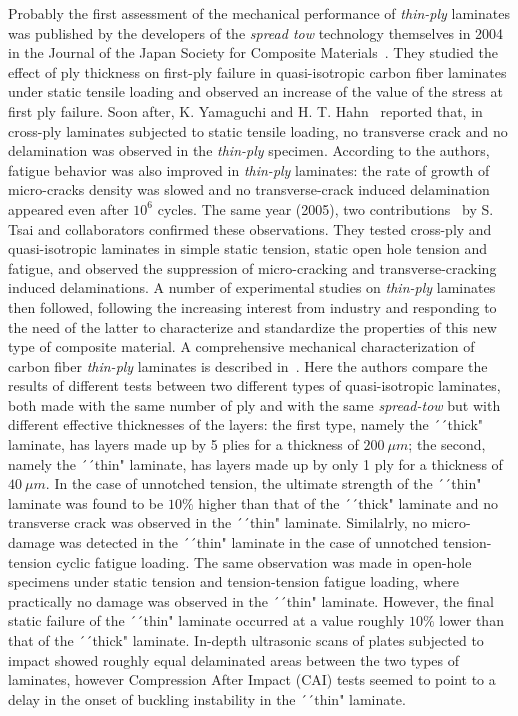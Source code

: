 \begin{description}
Probably the first assessment of the mechanical performance of \emph{thin-ply} laminates was published by the developers of the \emph{spread tow} technology themselves in 2004 in the Journal of the Japan Society for Composite Materials~\cite{sasayamaJSCM2004}. They studied the effect of ply thickness on first-ply failure in quasi-isotropic carbon fiber laminates under static tensile loading and observed an increase of the value of the stress at first ply failure.  Soon after, K. Yamaguchi and H. T. Hahn~\cite{Yamaguchi2005} reported that, in cross-ply laminates subjected to static tensile loading, no transverse crack and no delamination was observed in the \emph{thin-ply} specimen. According to the authors, fatigue behavior was also improved in \emph{thin-ply} laminates: the rate of growth of micro-cracks density was slowed and no transverse-crack induced delamination appeared even after $10^{6}$ cycles. The same year (2005), two contributions~\cite{TsaiICCM2005,Tsai2005} by S. Tsai and collaborators confirmed these observations. They tested cross-ply and quasi-isotropic laminates in simple static tension, static open hole tension and fatigue, and observed the suppression of micro-cracking and transverse-cracking induced delaminations. A number of experimental studies on \emph{thin-ply} laminates then followed, following the increasing interest from industry and responding to the need of the latter to characterize and standardize the properties of this new type of composite material. A comprehensive mechanical characterization of carbon fiber \emph{thin-ply} laminates is described in~\cite{Sihn2007}. Here the authors compare the results of different tests between two different types of quasi-isotropic laminates, both made with the same number of ply and with the same \emph{spread-tow} but with different effective thicknesses of the layers: the first type, namely the ´´thick" laminate, has layers made up by 5 plies for a thickness of $200\ \mu m$; the second, namely the ´´thin" laminate, has layers made up by only 1 ply for a thickness of $40\ \mu m$. In the case of unnotched tension, the ultimate strength of the ´´thin" laminate was found to be $10\%$ higher than that of the ´´thick" laminate and no transverse crack was observed in the ´´thin" laminate. Similalrly, no micro-damage was detected in the ´´thin" laminate in the case of unnotched tension-tension cyclic fatigue loading. The same observation was made in open-hole specimens under static tension and tension-tension fatigue loading, where practically no damage was observed in the ´´thin" laminate. However, the final static failure of the ´´thin" laminate occurred at a value roughly $10\%$ lower than that of the ´´thick" laminate. In-depth ultrasonic scans of plates subjected to impact showed roughly equal delaminated areas between the two types of laminates, however Compression After Impact (CAI) tests seemed to point to a delay in the onset of buckling instability in the ´´thin" laminate.


\end{description}

